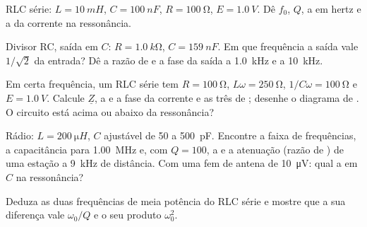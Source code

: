 \begin{exercise}[$\star$]\label{exo:b1:sinusoidal-impedance:4}
RLC série: $L = \qty{10}{mH}$, $C = \qty{100}{nF}$, $R = \qty{100}{\ohm}$,
$E = \qty{1.0}{V}$. Dê $f_0$, $Q$, a  em hertz e a
 da corrente na ressonância.
\end{exercise}

\begin{exercise}[$\star\star$]\label{exo:b1:sinusoidal-impedance:5}
Divisor RC, saída em $C$: $R = \qty{1.0}{k\ohm}$, $C = \qty{159}{nF}$.
Em que frequência a saída vale $1/\sqrt2$ da entrada? Dê a
razão de  e a fase da saída a \qty{1.0}{kHz} e a \qty{10}{kHz}.
\end{exercise}

\begin{exercise}[$\star\star$]\label{exo:b1:sinusoidal-impedance:6}
Em certa frequência, um RLC série tem $R = \qty{100}{\ohm}$, $L\omega =
\qty{250}{\ohm}$, $1/C\omega = \qty{100}{\ohm}$ e $E = \qty{1.0}{V}$.
Calcule $\underline Z$, a  e a fase da corrente e as três
 de ; desenhe o diagrama de . O circuito está acima ou
abaixo da ressonância?
\end{exercise}

\begin{exercise}[$\star\star$]\label{exo:b1:sinusoidal-impedance:7}
Rádio: $L = \qty{200}{\micro H}$, $C$ ajustável de \qty{50}{} a
\qty{500}{pF}. Encontre a faixa de frequências, a capacitância para
\qty{1.00}{MHz} e, com $Q = 100$, a  e a atenuação
(razão de ) de uma estação a \qty{9}{kHz} de distância. Com uma fem de antena de
\qty{10}{\micro V}: qual a  em $C$ na ressonância?
\end{exercise}

\begin{exercise}[$\star\star$]\label{exo:b1:sinusoidal-impedance:8}
Deduza as duas frequências de meia potência do RLC série e mostre que
a sua diferença vale $\omega_0/Q$ e o seu produto $\omega_0^2$.
\end{exercise}


